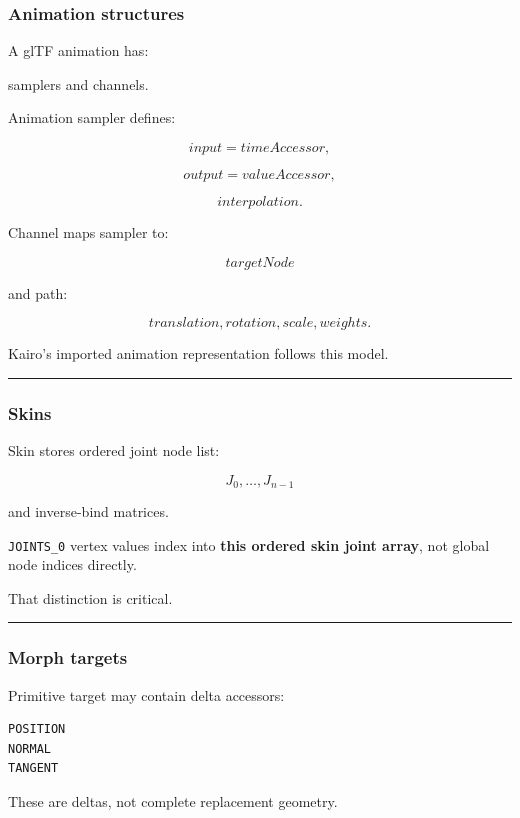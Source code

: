 \subsubsection{Animation structures}\label{animation-structures}

A glTF animation has:

samplers and channels.

Animation sampler defines:

\[
input=timeAccessor,
\]

\[
output=valueAccessor,
\]

\[
interpolation.
\]

Channel maps sampler to:

\[
targetNode
\]

and path:

\[
translation,
rotation,
scale,
weights.
\]

Kairo's imported animation representation follows this model.

\begin{center}\rule{0.5\linewidth}{0.5pt}\end{center}

\subsubsection{Skins}\label{skins}

Skin stores ordered joint node list:

\[
J_0,\dots,J_{n-1}
\]

and inverse-bind matrices.

\texttt{JOINTS\_0} vertex values index into \textbf{this ordered skin joint array}, not global node indices directly.

That distinction is critical.

\begin{center}\rule{0.5\linewidth}{0.5pt}\end{center}

\subsubsection{Morph targets}\label{morph-targets}

Primitive target may contain delta accessors:

\begin{verbatim}
POSITION
NORMAL
TANGENT
\end{verbatim}

These are deltas, not complete replacement geometry.

